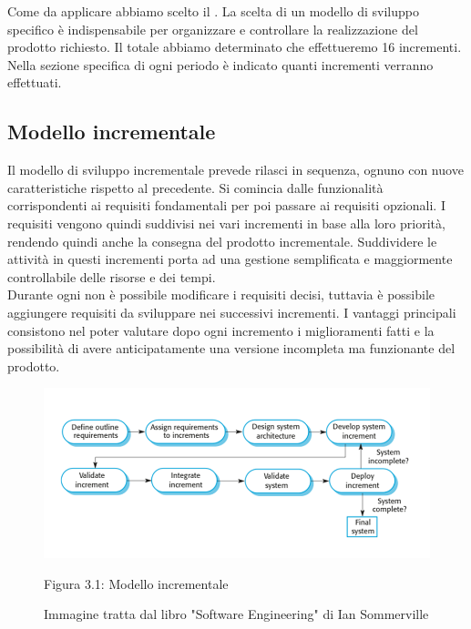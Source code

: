 Come  da applicare abbiamo scelto il . La scelta di un modello di sviluppo specifico è indispensabile per organizzare e controllare la realizzazione del prodotto richiesto. Il totale abbiamo determinato che effettueremo 16 incrementi. Nella sezione specifica di ogni periodo è indicato quanti incrementi verranno effettuati.

\subsection{Modello incrementale}
Il modello di sviluppo incrementale prevede rilasci in sequenza, ognuno con nuove caratteristiche rispetto al precedente. Si comincia dalle funzionalità corrispondenti ai requisiti fondamentali per poi passare ai requisiti opzionali. I requisiti vengono quindi suddivisi nei vari incrementi in base alla loro priorità, rendendo quindi anche la consegna del prodotto incrementale.
Suddividere le attività in questi incrementi porta ad una gestione semplificata e maggiormente controllabile delle risorse e dei tempi.\\
Durante ogni  non è possibile modificare i requisiti decisi, tuttavia è possibile aggiungere requisiti da sviluppare nei successivi incrementi.
I vantaggi principali consistono nel poter valutare dopo ogni incremento i miglioramenti fatti e la possibilità di avere anticipatamente una versione incompleta ma funzionante del prodotto. \\
\begin{center}
\begin{figure} [H]
	\centering
	\includegraphics[scale=0.65]{Img/Schema_modello_incrementale}
	\caption{Figura 3.1: Modello incrementale}\label{}
	\caption{Immagine tratta dal libro "Software Engineering" di Ian Sommerville}\label{}
\end{figure}
\end{center}
